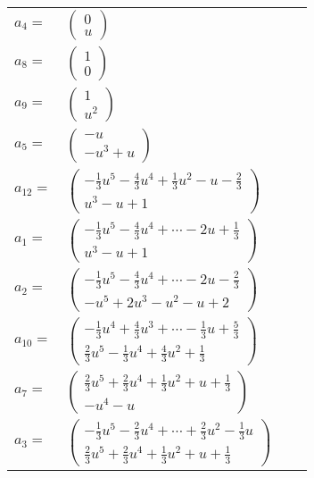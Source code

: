 \documentclass[1p]{elsarticle_modified}
\theoremstyle{definition}
\begin{document}
\begin{tabular}{m{7pt} m{180pt} m{7pt} m{180pt} }
\flushright $a_{4}=$&$\begin{pmatrix}0\\u\end{pmatrix}$ \\
\flushright $a_{8}=$&$\begin{pmatrix}1\\0\end{pmatrix}$ \\
\flushright $a_{9}=$&$\begin{pmatrix}1\\u^2\end{pmatrix}$ \\
\flushright $a_{5}=$&$\begin{pmatrix}- u\\- u^3+u\end{pmatrix}$ \\
\flushright $a_{12}=$&$\begin{pmatrix}-\frac{1}{3} u^5-\frac{4}{3} u^4+\frac{1}{3} u^2- u-\frac{2}{3}\\u^3- u+1\end{pmatrix}$ \\
\flushright $a_{1}=$&$\begin{pmatrix}-\frac{1}{3} u^5-\frac{4}{3} u^4+\cdots-2 u+\frac{1}{3}\\u^3- u+1\end{pmatrix}$ \\
\flushright $a_{2}=$&$\begin{pmatrix}-\frac{1}{3} u^5-\frac{4}{3} u^4+\cdots-2 u-\frac{2}{3}\\- u^5+2 u^3- u^2- u+2\end{pmatrix}$ \\
\flushright $a_{10}=$&$\begin{pmatrix}-\frac{1}{3} u^4+\frac{4}{3} u^3+\cdots-\frac{1}{3} u+\frac{5}{3}\\\frac{2}{3} u^5-\frac{1}{3} u^4+\frac{4}{3} u^2+\frac{1}{3}\end{pmatrix}$ \\
\flushright $a_{7}=$&$\begin{pmatrix}\frac{2}{3} u^5+\frac{2}{3} u^4+\frac{1}{3} u^2+u+\frac{1}{3}\\- u^4- u\end{pmatrix}$ \\
\flushright $a_{3}=$&$\begin{pmatrix}-\frac{1}{3} u^5-\frac{2}{3} u^4+\cdots+\frac{2}{3} u^2-\frac{1}{3} u\\\frac{2}{3} u^5+\frac{2}{3} u^4+\frac{1}{3} u^2+u+\frac{1}{3}\end{pmatrix}$ \\

\end{tabular}
\end{document}
